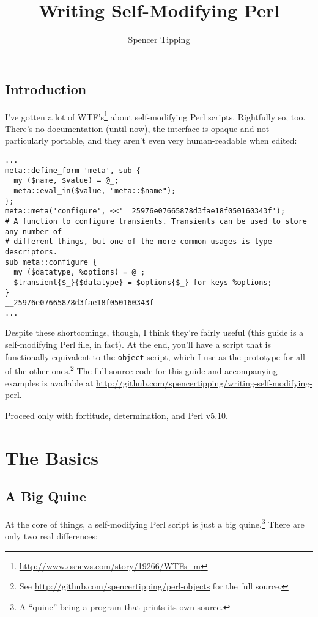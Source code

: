 \documentclass{report}
\title{Writing Self-Modifying Perl}
\author{Spencer Tipping}
\begin{document}
\maketitle{}
\tableofcontents{}

\chapter{Introduction}\label{sec:introduction}
  I've gotten a lot of WTF's\footnote{\url{http://www.osnews.com/story/19266/WTFs_m}} about self-modifying Perl scripts. Rightfully so, too. There's no documentation (until now), the interface
  is opaque and not particularly portable, and they aren't even very human-readable when edited:

\begin{verbatim}
...
meta::define_form 'meta', sub {
  my ($name, $value) = @_;
  meta::eval_in($value, "meta::$name");
};
meta::meta('configure', <<'__25976e07665878d3fae18f050160343f');
# A function to configure transients. Transients can be used to store any number of
# different things, but one of the more common usages is type descriptors.
sub meta::configure {
  my ($datatype, %options) = @_;
  $transient{$_}{$datatype} = $options{$_} for keys %options;
}
__25976e07665878d3fae18f050160343f
...
\end{verbatim}

  Despite these shortcomings, though, I think they're fairly useful (this guide is a self-modifying Perl file, in fact). At the end, you'll have a script that is functionally equivalent to the
  {\tt object} script, which I use as the prototype for all of the other ones.\footnote{See \url{http://github.com/spencertipping/perl-objects} for the full source.} The full source code for
  this guide and accompanying examples is available at \url{http://github.com/spencertipping/writing-self-modifying-perl}.

  Proceed only with fortitude, determination, and Perl v5.10.

\part{The Basics}
\chapter{A Big Quine}\label{sec:a-big-quine}
  At the core of things, a self-modifying Perl script is just a big quine.\footnote{A ``quine'' being a program that prints its own source.} There are only two real differences:
\end{document}
